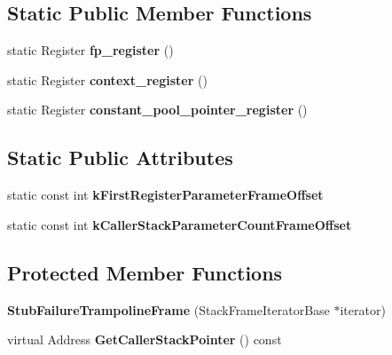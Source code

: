 \subsection*{Static Public Member Functions}
\begin{DoxyCompactItemize}
\item 
\hypertarget{classv8_1_1internal_1_1_stub_failure_trampoline_frame_a897629cf41f7d5568a0de2765a9debb5}{}static Register {\bfseries fp\+\_\+register} ()\label{classv8_1_1internal_1_1_stub_failure_trampoline_frame_a897629cf41f7d5568a0de2765a9debb5}

\item 
\hypertarget{classv8_1_1internal_1_1_stub_failure_trampoline_frame_a79d4e0f0afde2ec1a19ea1894a7b3fad}{}static Register {\bfseries context\+\_\+register} ()\label{classv8_1_1internal_1_1_stub_failure_trampoline_frame_a79d4e0f0afde2ec1a19ea1894a7b3fad}

\item 
\hypertarget{classv8_1_1internal_1_1_stub_failure_trampoline_frame_a6dcd5d34714d93db7dc14a330b56866a}{}static Register {\bfseries constant\+\_\+pool\+\_\+pointer\+\_\+register} ()\label{classv8_1_1internal_1_1_stub_failure_trampoline_frame_a6dcd5d34714d93db7dc14a330b56866a}

\end{DoxyCompactItemize}
\subsection*{Static Public Attributes}
\begin{DoxyCompactItemize}
\item 
static const int {\bfseries k\+First\+Register\+Parameter\+Frame\+Offset}
\item 
static const int {\bfseries k\+Caller\+Stack\+Parameter\+Count\+Frame\+Offset}
\end{DoxyCompactItemize}
\subsection*{Protected Member Functions}
\begin{DoxyCompactItemize}
\item 
\hypertarget{classv8_1_1internal_1_1_stub_failure_trampoline_frame_a9b61ed5ab4ea6b0c4d72a2dcce88db1f}{}{\bfseries Stub\+Failure\+Trampoline\+Frame} (Stack\+Frame\+Iterator\+Base $\ast$iterator)\label{classv8_1_1internal_1_1_stub_failure_trampoline_frame_a9b61ed5ab4ea6b0c4d72a2dcce88db1f}

\item 
\hypertarget{classv8_1_1internal_1_1_stub_failure_trampoline_frame_a506dd4b40ee77757404281c9a60b47a2}{}virtual Address {\bfseries Get\+Caller\+Stack\+Pointer} () const \label{classv8_1_1internal_1_1_stub_failure_trampoline_frame_a506dd4b40ee77757404281c9a60b47a2}

\end{DoxyCompactItemize}
